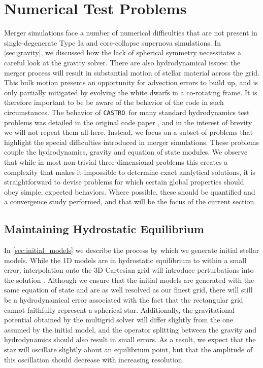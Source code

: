 \documentclass[iop]{../emulateapj}
\newcommand{\castro}{\texttt{CASTRO}}
\begin{document}
\section{Numerical Test Problems}\label{sec:Tests}

Merger simulations face a number of numerical difficulties that are
not present in single-degenerate Type Ia and core-collapse supernova
simulations. In \autoref{sec:gravity}, we discussed how the lack
of spherical symmetry necessitates a careful look at the gravity
solver. There are also hydrodynamical issues: the merger process will
result in substantial motion of stellar material across the grid. This
bulk motion presents an opportunity for advection errors to build up,
and is only partially mitigated by evolving the white dwarfs in a
co-rotating frame. It is therefore important to be be aware of the
behavior of the code in such circumstances. The behavior of \castro\ for
many standard hydrodynamics test problems was detailed in the original
code paper \citep{castro}, and in the interest of brevity we will not
repeat them all here. Instead, we focus on a subset of problems that
highlight the special difficulties introduced in merger
simulations. These problems couple the hydrodynamics, gravity and
equation of state modules. We observe that while in most non-trivial
three-dimensional problems this creates a complexity that makes it
impossible to determine exact analytical solutions, it is
straightforward to devise problems for which certain global properties
should obey simple, expected behaviors. Where possible, these should
be quantified and a convergence study performed, and that will 
be the focus of the current section.

\subsection{Maintaining Hydrostatic Equilibrium}\label{sec:HSE}

In \autoref{sec:initial_models} we describe the process by which
we generate initial stellar models. While the 1D models are in
hydrostatic equilibrium to within a small error, interpolation onto
the 3D Cartesian grid will introduce perturbations into the solution
\citep{zingale:2002}. Although we ensure that the initial models are
generated with the same equation of state and are as well resolved as
our finest grid, there will still be a hydrodynamical error associated
with the fact that the rectangular grid cannot faithfully represent a
spherical star. Additionally, the gravitational potential obtained by
the multigrid solver will differ slightly from the one assumed by the
initial model, and the operator splitting between the gravity and
hydrodynamics should also result in small errors. As a result, we
expect that the star will oscillate slightly about an equilibrium
point, but that the amplitude of this oscillation should decrease with
increasing resolution.
\end{document}
